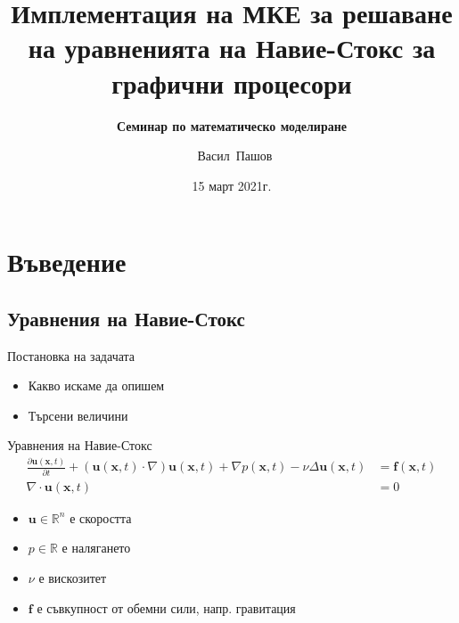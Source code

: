 \documentclass{beamer}
\title[]{Имплементация на МКЕ за решаване на уравненията на Навие-Стокс за графични процесори}
\subtitle{\textbf{Семинар по математическо моделиране}}
\author[]{~Васил~Пашов}
\date{15 март 2021г.}
\newcommand{\vecf}[1]{\boldsymbol{#1}}
\begin{document}
\begin{frame}
    \titlepage
\end{frame}

\section{Въведение}
\subsection{Уравнения на Навие-Стокс}

\begin{frame}{Постановка на задачата}
\begin{itemize}[<+->]
	\item Какво искаме да опишем
	\item Търсени величини
\end{itemize}
\end{frame}

\begin{frame}{Уравнения на Навие-Стокс}
\begin{align*}
  \frac{\partial \vecf{u}(\vecf{x}, t)}{\partial t} + (\vecf{u}(\vecf{x}, t)\cdot\nabla)\vecf{u}(\vecf{x}, t) + \nabla p(\vecf{x}, t) - \nu\Delta\vecf{u}(\vecf{x}, t) &= \vecf{f}(\vecf{x}, t)\\
  \nabla \cdot \vecf{u}(\vecf{x}, t) &= 0
\end{align*}
\begin{itemize}[<+->]
  \item $\vecf{u} \in \mathbb{R}^n$ е скоростта
  \item $p \in \mathbb{R}$ е налягането
  \item $\nu$ е вискозитет
  \item $\vecf{f}$ е съвкупност от обемни сили, напр. гравитация
\end{itemize}
\end{frame}
\end{document}
